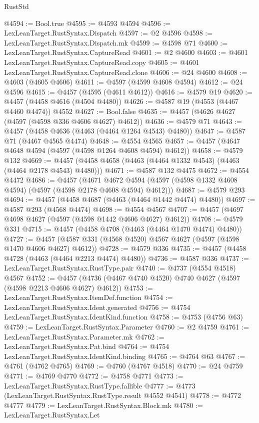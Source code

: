 \begin{lexlean}{RustStd}
\begin{coremodule}
@4594 := Bool.true
@4595 := @4593 @4594
@4596 := LexLeanTarget.RustSyntax.Dispatch
@4597 := @2 @4596
@4598 := LexLeanTarget.RustSyntax.Dispatch.mk
@4599 := @4598 @71
@4600 := LexLeanTarget.RustSyntax.CaptureRead
@4601 := @2 @4600
@4603 := @4601 LexLeanTarget.RustSyntax.CaptureRead.copy
@4605 := @4601 LexLeanTarget.RustSyntax.CaptureRead.clone
@4606 := @24 @4600
@4608 := @4603 (@4605 @4606)
@4611 := @4597 (@4599 @4608 @4594)
@4612 := @24 @4596
@4615 := @4457 (@4595 (@4611 @4612))
@4616 := @4579 @19
@4620 := @4457 (@4458 @4616 (@4504 @4480))
@4626 := @4587 @19 (@4553 (@4467 @4460 @4474)) @4552
@4627 := Bool.false
@4635 := @4457 (@4626 @4627 (@4597 (@4598 @336 @4606 @4627) @4612))
@4636 := @4579 @71
@4643 := @4457 (@4458 @4636 (@4463 (@4464 @1264 @4543) @4480))
@4647 := @4587 @71 (@4467 @4565 @4474)
@4648 := @4554 @4565
@4657 := @4457 (@4647 @4648 @4594 (@4597 (@4598 @1264 @4608 @4594) @4612))
@4658 := @4579 @132
@4669 := @4457 (@4458 @4658 (@4463 (@4464 @1332 @4543) (@4463 (@4464 @2178 @4543) @4480)))
@4671 := @4587 @132 @4475
@4672 := @4554 @4472
@4686 := @4457
    (@4671 @4672 @4594 (@4597 (@4598 @1332 @4608 @4594) (@4597 (@4598 @2178 @4608 @4594) @4612)))
@4687 := @4579 @293
@4694 := @4457 (@4458 @4687 (@4463 (@4464 @1442 @4474) @4480))
@4697 := @4587 @293 (@4568 @4474)
@4698 := @4554 @4567
@4707 := @4457 (@4697 @4698 @4627 (@4597 (@4598 @1442 @4606 @4627) @4612))
@4708 := @4579 @331
@4715 := @4457 (@4458 @4708 (@4463 (@4464 @1470 @4474) @4480))
@4727 := @4457 (@4587 @331 (@4568 @4520) @4567 @4627 (@4597 (@4598 @1470 @4606 @4627) @4612))
@4728 := @4579 @336
@4735 := @4457 (@4458 @4728 (@4463 (@4464 @2213 @4474) @4480))
@4736 := @4587 @336
@4737 := LexLeanTarget.RustSyntax.RustType.pair
@4740 := @4737 (@4554 @4518) @4567
@4752 := @4457 (@4736 (@4467 @4740 @4520) @4740 @4627 (@4597 (@4598 @2213 @4606 @4627) @4612))
@4753 := LexLeanTarget.RustSyntax.ItemDef.function
@4754 := LexLeanTarget.RustSyntax.Ident.generated
@4756 := @4754 LexLeanTarget.RustSyntax.IdentKind.function
@4758 := @4753 (@4756 @63)
@4759 := LexLeanTarget.RustSyntax.Parameter
@4760 := @2 @4759
@4761 := LexLeanTarget.RustSyntax.Parameter.mk
@4762 := LexLeanTarget.RustSyntax.Pat.bind
@4764 := @4754 LexLeanTarget.RustSyntax.IdentKind.binding
@4765 := @4764 @63
@4767 := @4761 (@4762 @4765)
@4769 := @4760 (@4767 @4518)
@4770 := @24 @4759
@4771 := @4769 @4770
@4772 := @4758 @4771
@4773 := LexLeanTarget.RustSyntax.RustType.fallible
@4777 := @4773 (LexLeanTarget.RustSyntax.RustType.result @4552 @4541)
@4778 := @4772 @4777
@4779 := LexLeanTarget.RustSyntax.Block.mk
@4780 := LexLeanTarget.RustSyntax.Let

\end{coremodule}
\end{lexlean}
